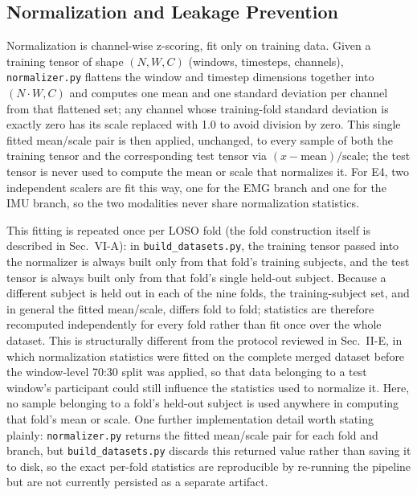 \documentclass[conference]{IEEEtran}
\begin{document}
\subsection{Normalization and Leakage Prevention}
\label{subsec:normalization}

Normalization is channel-wise z-scoring, fit only on training data.
Given a training tensor of shape $(N, W, C)$ (windows, timesteps,
channels), \texttt{normalizer.py} flattens the window and timestep
dimensions together into $(N{\cdot}W, C)$ and computes one mean and
one standard deviation per channel from that flattened set; any
channel whose training-fold standard deviation is exactly zero has
its scale replaced with 1.0 to avoid division by zero. This single
fitted mean/scale pair is then applied, unchanged, to every sample
of both the training tensor and the corresponding test tensor via
$(x-\text{mean})/\text{scale}$; the test tensor is never used to
compute the mean or scale that normalizes it. For E4, two
independent scalers are fit this way, one for the EMG branch and one
for the IMU branch, so the two modalities never share normalization
statistics.

This fitting is repeated once per LOSO fold (the fold construction
itself is described in Sec.~VI-A): in \texttt{build\_datasets.py},
the training tensor passed into the normalizer is always built only
from that fold's training subjects, and the test tensor is always
built only from that fold's single held-out subject. Because a
different subject is held out in each of the nine folds, the
training-subject set, and in general the fitted mean/scale, differs
fold to fold; statistics are therefore recomputed independently for
every fold rather than fit once over the whole dataset. This is
structurally different from the protocol reviewed in Sec.~II-E, in
which normalization statistics were fitted on the complete merged
dataset before the window-level 70:30 split was applied, so that
data belonging to a test window's participant could still influence
the statistics used to normalize it. Here, no sample belonging to a
fold's held-out subject is used anywhere in computing that fold's
mean or scale. One further implementation detail worth stating
plainly: \texttt{normalizer.py} returns the fitted mean/scale pair
for each fold and branch, but \texttt{build\_datasets.py} discards
this returned value rather than saving it to disk, so the exact
per-fold statistics are reproducible by re-running the pipeline but
are not currently persisted as a separate artifact.
\end{document}

